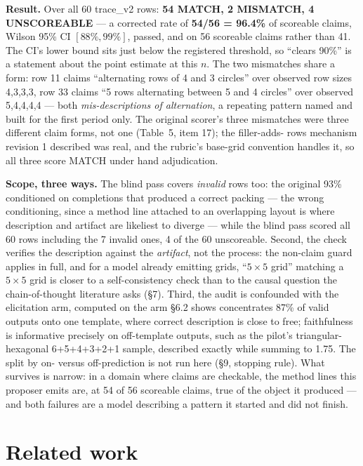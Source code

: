 \documentclass[11pt]{article}
\begin{document}
\textbf{Result.} Over all 60 trace\_v2 rows: \textbf{54 MATCH, 2 MISMATCH, 4 UNSCOREABLE} --- a corrected rate
of \textbf{54/56 = 96.4\%} of scoreable claims, Wilson 95\% CI $[88\%, 99\%]$, passed, and on 56 scoreable
claims rather than 41. The CI's lower bound sits just below the registered threshold, so ``clears
90\%'' is a statement about the point estimate at this $n$. The two mismatches share a form: row 11
claims ``alternating rows of 4 and 3 circles'' over observed row sizes 4,3,3,3, row 33 claims ``5
rows alternating between 5 and 4 circles'' over observed 5,4,4,4,4 --- both \textit{mis-descriptions of
alternation}, a repeating pattern named and built for the first period only. The original scorer's
three mismatches were three different claim forms, not one (Table~5, item 17); the filler-adds-
rows mechanism revision 1 described was real, and the rubric's base-grid convention handles it, so
all three score MATCH under hand adjudication.

\textbf{Scope, three ways.} The blind pass covers \textit{invalid} rows too: the original 93\% conditioned on
completions that produced a correct packing --- the wrong conditioning, since a method line attached
to an overlapping layout is where description and artifact are likeliest to diverge --- while the
blind pass scored all 60 rows including the 7 invalid ones, 4 of the 60 unscoreable. Second, the
check verifies the description against the \textit{artifact}, not the process: the non-claim guard
applies in full, and for a model already emitting grids, ``$5\times5$ grid'' matching a $5\times5$ grid is closer
to a self-consistency check than to the causal question the chain-of-thought literature asks (\S7).
Third, the audit is confounded with the elicitation arm, computed on the arm \S6.2 shows
concentrates 87\% of valid outputs onto one template, where correct description is close to free;
faithfulness is informative precisely on off-template outputs, such as the pilot's
triangular-hexagonal 6+5+4+3+2+1 sample, described exactly while summing to 1.75. The split by on-
versus off-prediction is not run here (\S9, stopping rule). What survives is narrow: in a domain
where claims are checkable, the method lines this proposer emits are, at 54 of 56 scoreable
claims, true of the object it produced --- and both failures are a model describing a pattern it
started and did not finish.

\section{Related work}
\end{document}
